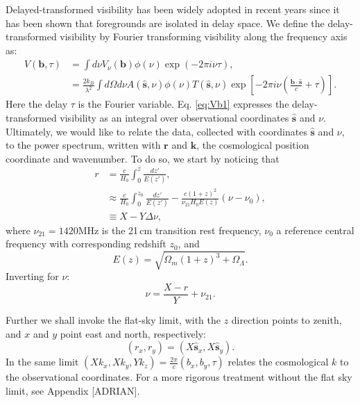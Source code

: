 \documentclass[twocolumn,apj,numberedappendix]{emulateapj}
\renewcommand\[{\begin{equation}}
\renewcommand\]{\end{equation}}
\begin{document}
Delayed-transformed visibility has been widely adopted in recent years since it has been shown that foregrounds are isolated in delay space. We define the delay-transformed visibility by Fourier transforming visibility along the frequency axis\citep{delay-transform} as:
\small
\begin{equation}
\begin{aligned}V(\boldsymbol{b},\tau) & =\int d\nu V_{\nu}(\boldsymbol{b})\phi(\nu)\exp\left(-2\pi i\nu\tau\right),\\
 & =\frac{2k_{B}}{\lambda^{2}}\int d\Omega d\nu A(\hat{\boldsymbol{s}},\nu)\phi(\nu)T(\hat{\boldsymbol{s}},\nu)\exp\left[-2\pi i\nu\left(\frac{\boldsymbol{b}\cdot\hat{\boldsymbol{s}}}{c}+\tau\right)\right]. 
\end{aligned}
\label{eq:Vb1}
\end{equation}
\normalsize
Here the delay $\tau$ is the Fourier variable. Eq. \eqref{eq:Vb1} expresses the delay-transformed visibility as
an integral over observational coordinates $\hat{\boldsymbol{s}}$ and $\nu$. Ultimately,
we would like to relate the data, collected with coordinates $\hat{\boldsymbol{s}}$
and $\nu$, to the power spectrum, written with 
$\boldsymbol{r}$ and $\boldsymbol{k}$, the cosmological position coordinate and wavenumber. To do so, we start by noticing that
\[
\begin{aligned}r & =\frac{c}{H_{0}}\int_{0}^{z}\frac{dz'}{E(z')},\\
 & \approx\frac{c}{H_{0}}\int_{0}^{z_{0}}\frac{dz'}{E(z')}-\frac{c(1+z)^{2}}{\nu_{21}H_{0}E(z)}\left(\nu-\nu_{0}\right),\\
 & \equiv X-Y\Delta\nu,
\end{aligned} \label{eq:r}
\]
where $\nu_{21}=1420$MHz is the 21\,cm transition rest frequency, $\nu_{0}$
a reference central frequency with corresponding redshift $z_{0}$,
and 
\[
E(z)=\sqrt{\Omega_{m}(1+z)^{3}+\Omega_{\Lambda}}.
\]
Inverting for $\nu$:
\begin{equation}
\nu=\frac{X-r}{Y}+\nu_{21}.\label{eq:nur}
\end{equation}

Further we shall invoke the flat-sky limit, with the $z$ direction points to zenith, and $x$ and $y$ point east and north, respectively:
\begin{equation}
(r_{x},r_{y})=(X\hat{\boldsymbol{s}}_{x},X\hat{\boldsymbol{s}}_{y}). 
\end{equation}
In the same limit $(Xk_{x},Xk_{y},Yk_{z})=\frac{2\pi}{c}(b_{x},b_{y},\tau)$ relates
the cosmological $k$ to the observational coordinates. For a more rigorous treatment without the flat sky limit, see Appendix [ADRIAN]. 
\end{document}
